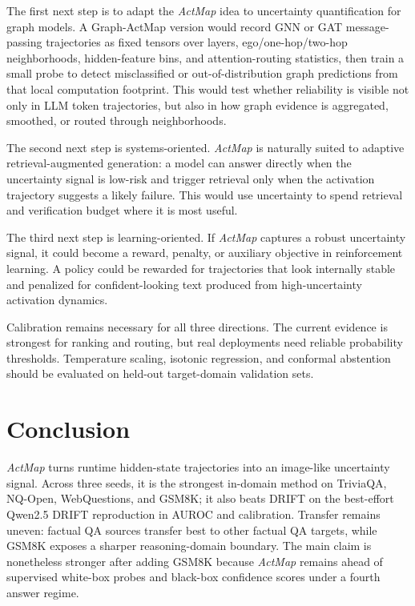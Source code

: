 \documentclass{article}
\newcommand{\actmap}{\textit{ActMap}}
\begin{document}
The first next step is to adapt the \actmap{} idea to uncertainty quantification for graph models. A Graph-ActMap version would record GNN or GAT message-passing trajectories as fixed tensors over layers, ego/one-hop/two-hop neighborhoods, hidden-feature bins, and attention-routing statistics, then train a small probe to detect misclassified or out-of-distribution graph predictions from that local computation footprint. This would test whether reliability is visible not only in LLM token trajectories, but also in how graph evidence is aggregated, smoothed, or routed through neighborhoods.

The second next step is systems-oriented. \actmap{} is naturally suited to adaptive retrieval-augmented generation: a model can answer directly when the uncertainty signal is low-risk and trigger retrieval only when the activation trajectory suggests a likely failure. This would use uncertainty to spend retrieval and verification budget where it is most useful.

The third next step is learning-oriented. If \actmap{} captures a robust uncertainty signal, it could become a reward, penalty, or auxiliary objective in reinforcement learning. A policy could be rewarded for trajectories that look internally stable and penalized for confident-looking text produced from high-uncertainty activation dynamics.

Calibration remains necessary for all three directions. The current evidence is strongest for ranking and routing, but real deployments need reliable probability thresholds. Temperature scaling, isotonic regression, and conformal abstention should be evaluated on held-out target-domain validation sets.

\section{Conclusion}

\actmap{} turns runtime hidden-state trajectories into an image-like uncertainty signal. Across three seeds, it is the strongest in-domain method on TriviaQA, NQ-Open, WebQuestions, and GSM8K; it also beats DRIFT on the best-effort Qwen2.5 DRIFT reproduction in AUROC and calibration. Transfer remains uneven: factual QA sources transfer best to other factual QA targets, while GSM8K exposes a sharper reasoning-domain boundary. The main claim is nonetheless stronger after adding GSM8K because \actmap{} remains ahead of supervised white-box probes and black-box confidence scores under a fourth answer regime.
\end{document}
